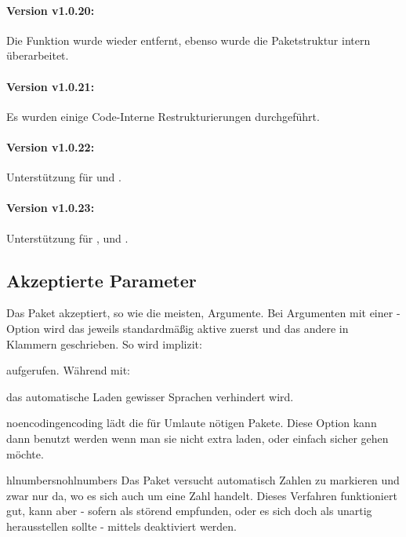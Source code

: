 \documentclass{sopra-base}
\begin{document}
\paragraph{Version v1.0.20:}
Die Funktion  wurde wieder entfernt, ebenso wurde die Paketstruktur intern überarbeitet.
\paragraph{Version v1.0.21:}
Es wurden einige Code-Interne Restrukturierungen durchgeführt.
\paragraph{Version v1.0.22:}
Unterstützung für  und .
\paragraph{Version v1.0.23:}
Unterstützung für ,  und .

\subsection{Akzeptierte Parameter}
    Das Paket akzeptiert, so wie die meisten, Argumente.
    Bei Argumenten mit einer -Option wird das jeweils standardmäßig aktive zuerst und das andere in Klammern
    geschrieben. So wird implizit:
\begin{plainlatex}
\usepackage[noencoding,hlnumbers,loadlangs,guardspace]{sopra-listings}
\end{plainlatex}
    aufgerufen. Während mit:
\begin{plainlatex}
\usepackage[noloadlangs]{sopra-listings}
\end{plainlatex}
    das automatische Laden gewisser Sprachen verhindert wird.

    \begin{argument}{noencoding}{encoding}
        \label{mrk:encoding} lädt die für Umlaute nötigen Pakete. Diese Option kann dann benutzt werden wenn man sie nicht extra laden, oder einfach sicher gehen möchte.
    \end{argument}

    \begin{argument}{hlnumbers}{nohlnumbers}
        Das Paket versucht automatisch Zahlen zu markieren und zwar nur da, wo es sich auch um eine Zahl handelt. Dieses Verfahren funktioniert gut, kann aber - sofern als störend empfunden, oder es sich doch als unartig herausstellen sollte - mittels  deaktiviert werden.
    \end{argument}
\end{document}
